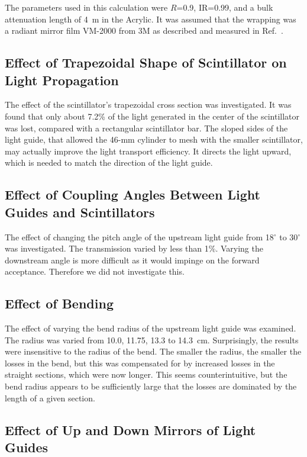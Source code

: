 The parameters used in this calculation were $R$=0.9, IR=0.99, and a bulk 
attenuation length of 4~m in the Acrylic.  It was assumed that the wrapping 
was a radiant mirror film VM-2000 from 3M as described and measured in 
Ref.~\cite{mutch}.

\subsection{Effect of Trapezoidal Shape of Scintillator on Light Propagation}
\label{mu1}

The effect of the scintillator's trapezoidal cross section was investigated.  
It was found that only about 7.2\% of the light generated in the center of the 
scintillator was lost, compared with a rectangular scintillator bar.  The 
sloped sides of the light guide, that allowed the 46-mm cylinder to mesh with 
the smaller scintillator, may actually improve the light transport efficiency. 
It directs the light upward, which is needed to match the direction of the 
light guide. 

\subsection{Effect of Coupling Angles Between Light Guides and Scintillators}
\label{mu2}

The effect of changing the pitch angle of the upstream light guide from 
18$^\circ$ to 30$^\circ$ was investigated.  The transmission varied by less 
than 1\%.  Varying the downstream angle is more difficult as it would impinge 
on the forward acceptance.  Therefore we did not investigate this.

\subsection{Effect of Bending}
\label{mu3}

The effect of varying the bend radius of the upstream light guide was examined.
The radius was varied from 10.0, 11.75, 13.3 to 14.3~cm.  Surprisingly, the 
results were insensitive to the radius of the bend.  The smaller the radius, 
the smaller the losses in the bend, but this was compensated for by increased 
losses in the straight sections, which were now longer.  This seems 
counterintuitive, but the bend radius appears to be sufficiently large that the 
losses are dominated by the length of a given section.  

\subsection{Effect of Up and Down Mirrors of Light Guides}
\label{mu4}

